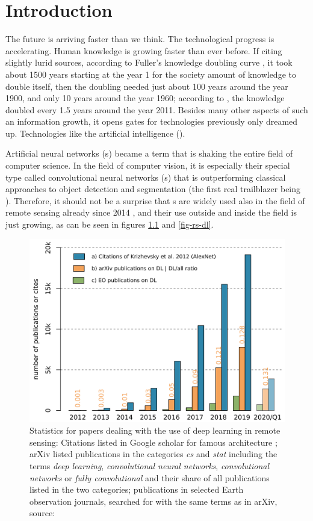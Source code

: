 \chapter{Introduction}
\label{intro}

The future is arriving faster than we think. The technological progress is accelerating. Human knowledge is growing faster than ever before. If citing slightly lurid sources, according to Fuller's knowledge doubling curve \cite{knowledge-doubling-curve}, it took about 1500 years starting at the year 1 for the society amount of knowledge to double itself, then the doubling needed just about 100 years around the year 1900, and only 10 years around the year 1960; according to \cite{growth-forecast}, the knowledge doubled every 1.5 years around the year 2011. Besides many other aspects of such an information growth, it opens gates for technologies previously only dreamed up. Technologies like the artificial intelligence ().

Artificial neural networks (s) became a term that is shaking the entire field of computer science. In the field of computer vision, it is especially their special type called convolutional neural networks (s) that is outperforming classical approaches to object detection and segmentation (the first real trailblazer being \cite{cnn-classification}). Therefore, it should not be a surprise that s are widely used also in the field of remote sensing already since 2014 \cite{review-dl-rs-2017}, and their use outside and inside the field is just growing, as can be seen in figures \ref{fig-dl} and \ref{fig-rs-dl}.

\begin{figure}[h]
   \centering
	\includegraphics[width=0.6\linewidth]{./pictures/dl-papers.png}
	\caption[Papers on the use of DL]{Statistics for papers dealing with the use of deep learning in remote sensing: Citations listed in Google scholar for famous  architecture \cite{cnn-classification}; arXiv listed publications in the categories \textit{cs} and \textit{stat} including the terms \textit{deep learning}, \textit{convolutional neural networks}, \textit{convolutional networks} or \textit{fully convolutional} and their share of all publications listed in the two categories; publications in selected Earth observation journals, searched for with the same terms as in arXiv, source: \cite{review-dl-eo}}
      \label{fig-dl}
\end{figure}

